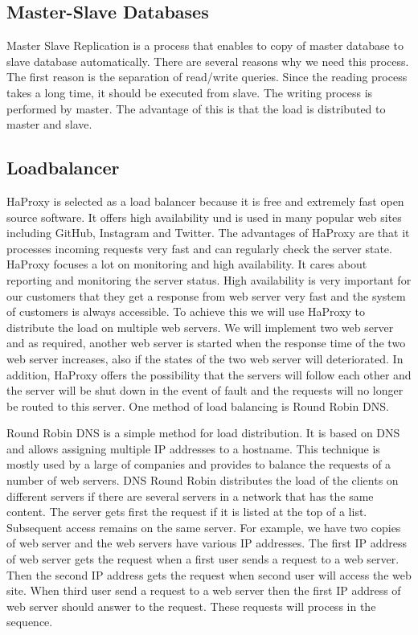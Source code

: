 \subsection{Master-Slave Databases}

Master Slave Replication is a process that enables to copy of master database to slave database automatically. There are several reasons why we need this process. The first reason is the separation of read/write queries. Since the reading process takes a long time, it should be executed from slave. The writing process is performed by master. The advantage of this is that the load is distributed to master and slave. 
\subsection{Loadbalancer}
HaProxy is selected as a load balancer because it is free and extremely fast open source software. It offers high availability und is used in many popular web sites including GitHub, Instagram and Twitter. The advantages of HaProxy are that it processes incoming requests very fast and can regularly check the server state. HaProxy focuses a lot on monitoring and high availability. It cares about reporting and monitoring the server status. High availability is very important for our customers that they get a response from web server very fast and the system of customers is always accessible. To achieve this we will use HaProxy to distribute the load on multiple web servers. We will implement two web server and as required, another web server is started when the response time of the two web server increases, also if the states of the two web server will deteriorated. In addition, HaProxy offers the possibility that the servers will follow each other and the server will be shut down in the event of fault and the requests will no longer be routed to this server. One method of load balancing is Round Robin DNS.

Round Robin DNS is a simple method for load distribution. It is based on DNS and allows assigning multiple IP addresses to a hostname. This technique is mostly used by a large of companies and provides to balance the requests of a number of web servers. DNS Round Robin distributes the load of the clients on different servers if there are several servers in a network that has the same content. The server gets first the request if it is listed at the top of a list. Subsequent access remains on the same server.  For example, we have two copies of web server and the web servers have various IP addresses. The first IP address of web server gets the request when a first user sends a request to a web server.  Then the second IP address gets the request when second user will access the web site. When third user send a request to a web server then the first IP address of web server should answer to the request. These requests will process in the sequence. 

